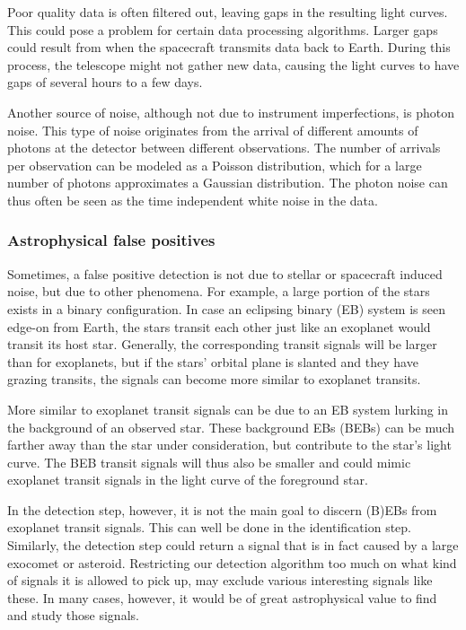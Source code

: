 Poor quality data is often filtered out, leaving gaps in the resulting light curves. This could pose a problem for certain data processing algorithms. Larger gaps could result from when the spacecraft transmits data back to Earth. During this process, the telescope might not gather new data, causing the light curves to have gaps of several hours to a few days.

Another source of noise, although not due to instrument imperfections, is photon noise. This type of noise originates from the arrival of different amounts of photons at the detector between different observations. The number of arrivals per observation can be modeled as a Poisson distribution, which for a large number of photons approximates a Gaussian distribution. The photon noise can thus often be seen as the time independent white noise in the data.

\subsubsection{Astrophysical false positives}

Sometimes, a false positive detection is not due to stellar or spacecraft induced noise, but due to other phenomena. For example, a large portion of the stars exists in a binary configuration. In case an eclipsing binary (EB) system is seen edge-on from Earth, the stars transit each other just like an exoplanet would transit its host star. Generally, the corresponding transit signals will be larger than for exoplanets, but if the stars' orbital plane is slanted and they have grazing transits, the signals can become more similar to exoplanet transits. 

More similar to exoplanet transit signals can be due to an EB system lurking in the background of an observed star. These background EBs (BEBs) can be much farther away than the star under consideration, but contribute to the star's light curve. The BEB transit signals will thus also be smaller and could mimic exoplanet transit signals in the light curve of the foreground star.

In the detection step, however, it is not the main goal to discern (B)EBs from exoplanet transit signals. This can well be done in the identification step. Similarly, the detection step could return a signal that is in fact 
caused by a large exocomet or asteroid. Restricting our detection algorithm too much on what kind of signals it is allowed to pick up, may exclude various interesting signals like these. In many cases, however, it would be of great astrophysical value to find and study those signals.

